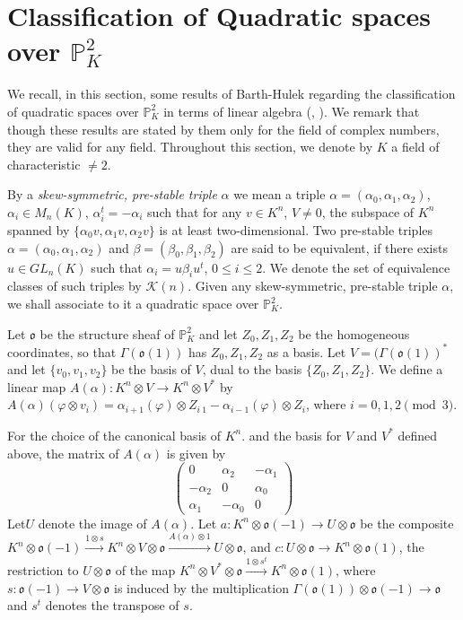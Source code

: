 \section{Classification of Quadratic spaces over \texorpdfstring{$\mathbb{P}^{2}_K$}{eq}}\label{s1}\pageoriginale

We recall, in this section, some results of Barth-Hulek regarding the classification of quadratic spaces over $\mathbb{P}^{2}_K$ in  terms of linear algebra (\cite{key2}, \cite{key4}). We remark that though these results are stated by them only for the field of complex numbers, they are valid for any field. Throughout this section, we denote by $K$ a field of characteristic $\neq 2$. 

By a \textit{skew-symmetric, pre-stable triple} $\alpha$ we mean a triple $\alpha=\left(\alpha_0,\alpha_1,\alpha_2\right)$, $\alpha_i\in M_n(K)$, $\alpha^{t}_i=-\alpha_i$ such that for any $v\in K^{n}$, $V\neq 0$, the subspace of $K^{n}$ spanned by $\{\alpha_0 v, \alpha_1 v,\alpha_2v\}$ is at least two-dimensional. Two pre-stable triples $\alpha=\left(\alpha_0,\alpha_1,\alpha_2\right)$ and $\beta=(\beta_0,\beta_1,\beta_2)$ are said to be equivalent, if there exists $u\in GL_n(K)$ such that $\alpha_i=u\beta_iu^{t}$, $0\leq i\leq 2$. We denote the set of equivalence classes of such triples by $\mathscr{K}(n)$. Given any skew-symmetric, pre-stable triple $\alpha$, we shall associate to it a quadratic space over $\mathbb{P}^{2}_K$. 

Let $\mathfrak{o}$ be the structure sheaf of $\mathbb{P}^{2}_K$ and let $Z_0,Z_1,Z_2$ be the homogeneous coordinates, so that $\Gamma(\mathfrak{o}(1))$ has $Z_0,Z_1,Z_2$ as a basis. Let $V=(\Gamma(\mathfrak{o}(1))^{\ast}$ and let $\{v_0,v_1,v_2\}$ be the basis of $V$, dual to the basis $\{Z_0,Z_1,Z_2\}$. We define a linear map $A(\alpha):K^{n}\otimes V\to K^{n}\otimes V^{\ast}$ by $A(\alpha) (\varphi \otimes v_i)=\alpha_{i+1}(\varphi)\otimes Z_{i\ 1}-\alpha_{i-1}(\varphi)\otimes Z_i$, where $i=0,1,2\pmod 3$.

For the choice of the canonical basis of $K^{n}$. and the basis for $V$ and $V^{\ast}$ defined above, the matrix of $A(\alpha)$ is given by 
$$
\begin{pmatrix}
0 &\alpha_2 &-\alpha_1\\
-\alpha_2 & 0 &\alpha_0\\
\alpha_1& -\alpha_0 & 0
\end{pmatrix}
$$
Let\pageoriginale $U$ denote the image of $A(\alpha)$. Let $a:K^{n}\otimes \mathfrak{o}(-1)\to U\otimes \mathfrak{o}$ be the composite $K^{n}\otimes \mathfrak{o}(-1)\xrightarrow{1\otimes s} K^{n}\otimes V\otimes \mathfrak{o}\xrightarrow{A(\alpha)\otimes 1} U\otimes\mathfrak{o}$, and $c:U\otimes \mathfrak{o}\to K^{n}\otimes \mathfrak{o}(1)$, the restriction to $U\otimes \mathfrak{o}$ of the map $K^{n}\otimes V^{\ast}\otimes \mathfrak{o}\xrightarrow{1\otimes s^{t}} K^{n} \otimes \mathfrak{o}(1)$, where $s:\mathfrak{o}(-1)\to V\otimes \mathfrak{o}$ is induced by the multiplication $\Gamma(\mathfrak{o}(1))\otimes \mathfrak{o}(-1)\to \mathfrak{o}$ and $s^{t}$ denotes the transpose of $s$. 

